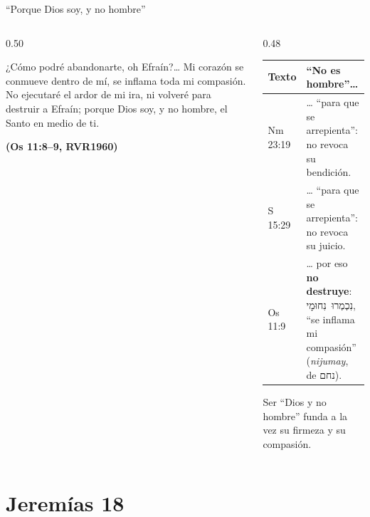 \documentclass[hyperref={bookmarks=false},aspectratio=169]{beamer}
\newcommand{\heb}[1]{\mbox{\foreignlanguage{hebrew}{#1}}}
\newcommand{\fuente}[1]{\par\hfill{\upshape\bfseries\footnotesize\textcolor{azul}{#1}}}
\newcommand{\destacar}[1]{\textbf{\textcolor{azul}{#1}}}
\begin{document}
\begin{frame}{``Porque Dios soy, y no hombre''}
\begin{columns}[t,onlytextwidth]
\begin{column}{0.50\textwidth}
\begin{cita}¿Cómo podré abandonarte, oh Efraín?\ldots{} Mi corazón se conmueve dentro de mí, se inflama toda mi compasión. No ejecutaré el ardor de mi ira, ni volveré para destruir a Efraín; porque Dios soy, y no hombre, el Santo en medio de ti.\fuente{(Os 11:8--9, RVR1960)}\end{cita}
\end{column}
\begin{column}{0.48\textwidth}
\scriptsize\renewcommand{\arraystretch}{1.18}
\begin{tabular}{@{}>{\RaggedRight\arraybackslash}p{1.4cm}>{\RaggedRight\arraybackslash}p{3.8cm}@{}}
\toprule
\textbf{Texto} & \textbf{``No es hombre''\ldots} \\ \midrule
Nm 23:19 & \ldots{} ``para que se arrepienta'': no revoca su bendición. \\
1 S 15:29 & \ldots{} ``para que se arrepienta'': no revoca su juicio. \\
Os 11:9 & \ldots{} por eso \destacar{no destruye}: \heb{נִכְמְרוּ נִחוּמָי}, ``se inflama mi compasión'' (\emph{nijumay}, de \heb{נחם}). \\
\bottomrule
\end{tabular}\par\smallskip
\small Ser ``Dios y no hombre'' funda a la vez su firmeza y su compasión.
\end{column}
\end{columns}
\end{frame}

\section{Jeremías 18}
\end{document}
